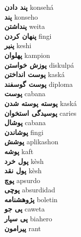 \textbf{ پند دادن  } konsehá \\
\textbf{ پند  } konseho \\
\textbf{ پنداشتن  } weita \\
\textbf{ پنهان کردن  } fingi \\
\textbf{ پنیر  } keshi \\
\textbf{ پهلوان  } kampion \\
\textbf{ پوزش خواستن  } diskulpá \\
\textbf{ پوست انداختن  } kaská \\
\textbf{ پوست گوسفند  } diploma \\
\textbf{ پوست  } cabana \\
\textbf{ پوسته پوسته شدن  } kaská \\
\textbf{ پوسیدگی استخوان  } caries \\
\textbf{ پوشال  } cabana \\
\textbf{ پوشاندن  } fingi \\
\textbf{ پوشش  } aplikashon \\
\textbf{ پوشه  } kaft \\
\textbf{ پول خرد  } kèsh \\
\textbf{ پول نقد  } kèsh \\
\textbf{ پوچ  } apsurdo \\
\textbf{ پوچی  } absurdidad \\
\textbf{ پژوهشنامه  } boletin \\
\textbf{ پی جو  } caweta \\
\textbf{ پی سپار  } biahero \\
\textbf{ پیرامون  } rant \\
